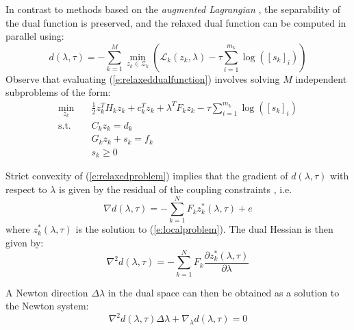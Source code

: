 In contrast to methods based on the \emph{augmented Lagrangian} \cite{Kozma2013}, the separability of the dual function is preserved, and the relaxed dual function can be computed in parallel using:
\begin{equation}
\label{e:relaxeddualfunction}
d(\lambda, \tau) = -\sum_{k=1}^M \min_{z_k \in \mathcal{Z}_k} \left( \mathcal{L}_k(z_k, \lambda) - \tau \sum_{i=1}^{m_k} \log([s_k]_i) \right)
\end{equation}
Observe that evaluating (\ref{e:relaxeddualfunction}) involves solving $M$ independent subproblems of the form:
\begin{equation}
\label{e:localproblem}
\begin{aligned}
\min_{z_k} & \quad \frac{1}{2}z_k^T H_k z_k + c_k^T z_k + \lambda^TF_k z_k - \tau \sum_{i=1}^{m_k} \log([s_k]_i) \\
\text{s.t.} & \quad C_k z_k = d_k \\ 
& \quad G_k z_k + s_k = f_k \\
& \quad s_k \geq 0
\end{aligned}
\end{equation}

Strict convexity of (\ref{e:relaxedproblem}) implies that the gradient of $d(\lambda, \tau)$ with respect to $\lambda$ is given by the residual of the coupling constraints \cite{Bertsekas1989}, i.e.
\begin{equation}
\label{e:dualgradient}
\nabla d(\lambda, \tau) = -\sum_{k=1}^N F_k z_k^*(\lambda, \tau) + e
\end{equation}
where $z_k^*(\lambda, \tau)$ is the solution to (\ref{e:localproblem}).
The dual Hessian is then given by:
\begin{equation}
\label{e:dualhessian}
\nabla^2 d(\lambda, \tau) = -\sum_{k=1}^N F_k \frac{\partial z_k^*(\lambda, \tau)}{\partial \lambda}
\end{equation}

A Newton direction $\Delta \lambda$ in the dual space can then be obtained as a solution to the Newton system:
\begin{equation}
\label{e:NewtonSystem}
\nabla^2 d(\lambda, \tau) \Delta \lambda + \nabla_{\lambda} d(\lambda, \tau) = 0
\end{equation}

